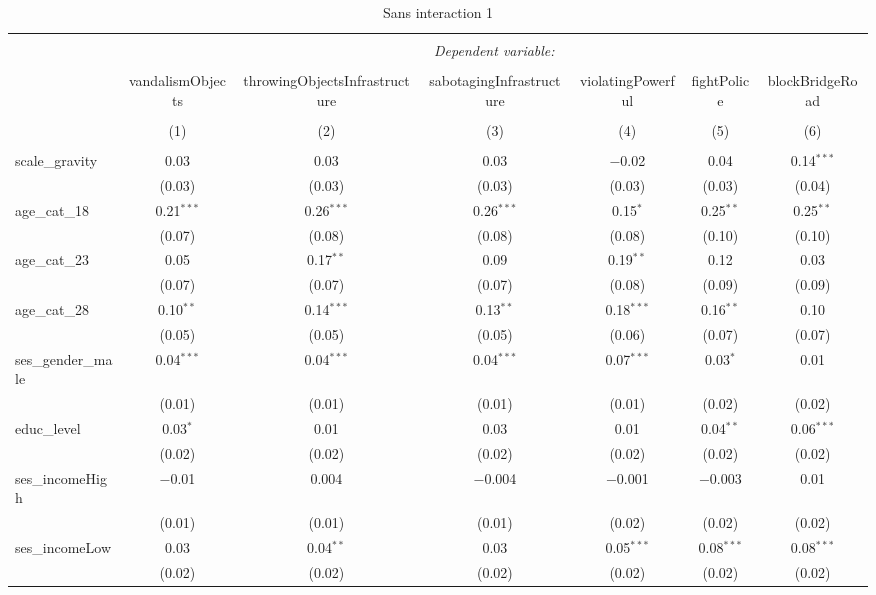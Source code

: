 \documentclass[
]{article}
\author{}
\date{\vspace{-2.5em}}
\begin{document}
\begin{sidewaystable}[!htbp] \centering 
  \caption{Sans interaction 1} 
  \label{} 
\begin{tabular}{@{\extracolsep{1pt}}lcccccc} 
\\[-1.8ex]\hline 
\hline \\[-1.8ex] 
 & \multicolumn{6}{c}{\textit{Dependent variable:}} \\ 
\cline{2-7} 
\\[-1.8ex] & vandalismObjects & throwingObjectsInfrastructure & sabotagingInfrastructure & violatingPowerful & fightPolice & blockBridgeRoad \\ 
\\[-1.8ex] & (1) & (2) & (3) & (4) & (5) & (6)\\ 
\hline \\[-1.8ex] 
 scale\_gravity & 0.03 & 0.03 & 0.03 & $-$0.02 & 0.04 & 0.14$^{***}$ \\ 
  & (0.03) & (0.03) & (0.03) & (0.03) & (0.03) & (0.04) \\ 
  age\_cat\_18 & 0.21$^{***}$ & 0.26$^{***}$ & 0.26$^{***}$ & 0.15$^{*}$ & 0.25$^{**}$ & 0.25$^{**}$ \\ 
  & (0.07) & (0.08) & (0.08) & (0.08) & (0.10) & (0.10) \\ 
  age\_cat\_23 & 0.05 & 0.17$^{**}$ & 0.09 & 0.19$^{**}$ & 0.12 & 0.03 \\ 
  & (0.07) & (0.07) & (0.07) & (0.08) & (0.09) & (0.09) \\ 
  age\_cat\_28 & 0.10$^{**}$ & 0.14$^{***}$ & 0.13$^{**}$ & 0.18$^{***}$ & 0.16$^{**}$ & 0.10 \\ 
  & (0.05) & (0.05) & (0.05) & (0.06) & (0.07) & (0.07) \\ 
  ses\_gender\_male & 0.04$^{***}$ & 0.04$^{***}$ & 0.04$^{***}$ & 0.07$^{***}$ & 0.03$^{*}$ & 0.01 \\ 
  & (0.01) & (0.01) & (0.01) & (0.01) & (0.02) & (0.02) \\ 
  educ\_level & 0.03$^{*}$ & 0.01 & 0.03 & 0.01 & 0.04$^{**}$ & 0.06$^{***}$ \\ 
  & (0.02) & (0.02) & (0.02) & (0.02) & (0.02) & (0.02) \\ 
  ses\_incomeHigh & $-$0.01 & 0.004 & $-$0.004 & $-$0.001 & $-$0.003 & 0.01 \\ 
  & (0.01) & (0.01) & (0.01) & (0.02) & (0.02) & (0.02) \\ 
  ses\_incomeLow & 0.03 & 0.04$^{**}$ & 0.03 & 0.05$^{***}$ & 0.08$^{***}$ & 0.08$^{***}$ \\ 
  & (0.02) & (0.02) & (0.02) & (0.02) & (0.02) & (0.02) \\ 

\end{tabular}
\end{sidewaystable}
\end{document}
